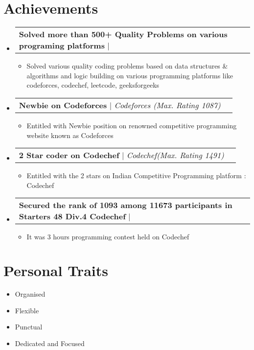 \documentclass[letterpaper,11pt]{article}
\makeatletter
\newcommand{\resumeItem}[1]{
  \item\small{
    {#1 \vspace{-2pt}}
  }
}
\newcommand{\resumeProjectHeading}[2]{
    \item
    \begin{tabular*}{1.001\textwidth}{l@{\extracolsep{\fill}}r}
      \small#1 & \textbf{\small #2}\\
    \end{tabular*}\vspace{-7pt}
}
\newcommand{\resumeSubHeadingListStart}{\begin{itemize}[leftmargin=0.0in, label={}]}
\newcommand{\resumeSubHeadingListEnd}{\end{itemize}}
\newcommand{\resumeItemListStart}{\begin{itemize}}
\newcommand{\resumeItemListEnd}{\end{itemize}\vspace{-5pt}}
\makeatother
\begin{document}
{\section{Achievements}
\vspace{-6pt}
\resumeSubHeadingListStart
        \resumeProjectHeading
          {\textbf{Solved more than 500+ Quality Problems on various programing platforms} $|$ \emph{}}{}
            \resumeItemListStart
                \resumeItem{Solved various quality coding problems based on data structures \& algorithms and logic building on various programming platforms like codeforces, codechef, leetcode, geeksforgeeks}
            \resumeItemListEnd
        \resumeSubHeadingListEnd
     \vspace{-32pt} 
    \resumeSubHeadingListStart
        \resumeProjectHeading
          {\textbf{Newbie on Codeforces } $|$ \emph{Codeforces (Max. Rating 1087)}}{}
            \resumeItemListStart
                \resumeItem{Entitled with Newbie position on renowned competitive programming website known as Codeforces}
            \resumeItemListEnd
        \resumeSubHeadingListEnd
     \vspace{-34pt}
    \resumeSubHeadingListStart
        \resumeProjectHeading
          {\textbf{2 Star coder on Codechef } $|$ \emph{Codechef(Max. Rating 1491)}}{}
            \resumeItemListStart
                \resumeItem{Entitled with the 2 stars on Indian Competitive Programming platform : Codechef}
            \resumeItemListEnd
        \resumeSubHeadingListEnd
     \vspace{-34pt}
     \resumeSubHeadingListStart
        \resumeProjectHeading
          {\textbf{Secured the rank of 1093 among 11673 participants in Starters 48 Div.4 Codechef } $|$ \emph{}}{}
            \resumeItemListStart
                \resumeItem{It was 3 hours programming contest held on Codechef }
            \resumeItemListEnd
        \resumeSubHeadingListEnd
     \vspace{-12pt}
     

    

\section{Personal Traits}
        \begin{multicols}{4}
        
            \begin{itemize}[itemsep=-5pt, parsep=3pt]
                \item\small Organised
                \item Flexible
                \item Punctual
                \item Dedicated and Focused
            \end{itemize}
        \end{multicols}
\vspace{-2pt}

}
\end{document}
